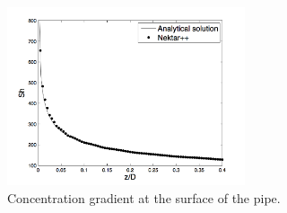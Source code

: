 \begin{figure}[h!]
\begin{center}
\includegraphics[width=7cm]{img/graetz-nusselt}
\caption{Concentration gradient at the surface of the pipe.}
\label{f:adrsolver:masstransport}
\end{center}
\end{figure}



